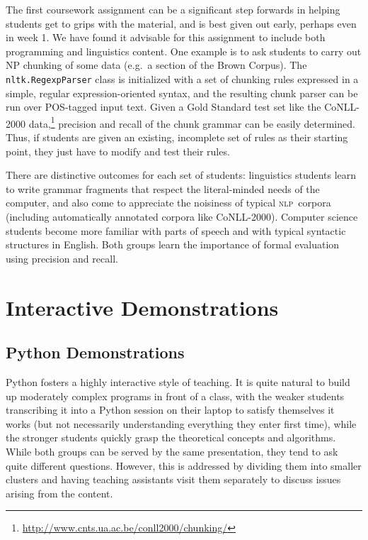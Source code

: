 \documentclass[11pt]{article}
\newcommand{\NLP}{\textsc{nlp}}
\newcommand{\code}[1]{\texttt{\small #1}}
\begin{document}
The first coursework assignment can be a significant step forwards in
helping students get to grips with the material, and is best given out
early, perhaps even in week 1.  We have found it advisable for this
assignment to include both programming and linguistics content. One
example is to ask students to carry out NP chunking of some data
(e.g.\ a section of the Brown Corpus). The \code{nltk.RegexpParser}
class is initialized with a set of chunking rules expressed in a
simple, regular expression-oriented syntax, and the resulting chunk
parser can be run over POS-tagged input text. Given a Gold Standard
test set like the CoNLL-2000
data,\footnote{\url{http://www.cnts.ua.ac.be/conll2000/chunking/}}
precision and recall of the chunk grammar can be easily determined.
Thus, if students are given an existing, incomplete set of rules as
their starting point, they just have to modify and test their rules.

There are distinctive outcomes for each set of students: linguistics students
learn to write grammar fragments that respect the literal-minded
needs of the computer, and also come to appreciate the noisiness of
typical \NLP\ corpora (including automatically annotated corpora like
CoNLL-2000).
Computer science students become more familiar with parts of speech
and with typical syntactic structures in English. Both groups learn
the importance of formal evaluation using precision and recall.

\section{Interactive Demonstrations}
\label{sec:interactive-demonstrations}

\subsection{Python Demonstrations}

Python fosters a highly interactive style of teaching.  It is quite
natural to build up moderately complex programs in front of a class,
with the weaker students transcribing it into a Python session on
their laptop to satisfy themselves it works (but not necessarily
understanding everything they enter first time), while the stronger
students quickly grasp the theoretical concepts and algorithms.  While
both groups can be served by the same presentation, they tend to ask
quite different questions.  However, this is addressed by dividing
them into smaller clusters and having teaching assistants visit them
separately to discuss issues arising from the content.
\end{document}
